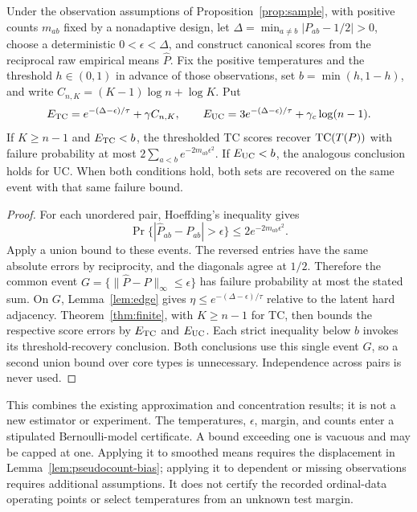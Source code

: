 \begin{corollary}\label{cor:finite-sample-recovery}
Under the observation assumptions of Proposition~\ref{prop:sample}, with positive counts $m_{ab}$ fixed by a nonadaptive design, let $\Delta=\min_{a\ne b}|P_{ab}-1/2|>0$, choose a deterministic $0<\epsilon<\Delta$, and construct canonical scores from the reciprocal raw empirical means $\widehat P$. Fix the positive temperatures and the threshold $h\in(0,1)$ in advance of those observations, set $b=\min(h,1-h)$, and write $C_{n,K}=(K-1)\log n+\log K$. Put
\[
E_{\mathrm{TC}}=e^{-(\Delta-\epsilon)/\tau}+\gamma C_{n,K},\qquad
E_{\mathrm{UC}}=3e^{-(\Delta-\epsilon)/\tau}+\gamma_c\log(n-1).
\]
If $K\ge n-1$ and $E_{\mathrm{TC}}<b$, the thresholded TC scores recover $\mathrm{TC}(T(P))$ with failure probability at most $2\sum_{a<b}e^{-2m_{ab}\epsilon^2}$. If $E_{\mathrm{UC}}<b$, the analogous conclusion holds for UC. When both conditions hold, both sets are recovered on the same event with that same failure bound.
\end{corollary}
\begin{proof}
For each unordered pair, Hoeffding's inequality gives
\[
\Pr\{|\widehat P_{ab}-P_{ab}|>\epsilon\}\le2e^{-2m_{ab}\epsilon^2}.
\]
Apply a union bound to these events. The reversed entries have the same absolute errors by reciprocity, and the diagonals agree at $1/2$. Therefore the common event
$G=\{\|\widehat P-P\|_\infty\le\epsilon\}$ has failure probability at most the stated sum. On $G$, Lemma~\ref{lem:edge} gives $\eta\le e^{-(\Delta-\epsilon)/\tau}$ relative to the latent hard adjacency. Theorem~\ref{thm:finite}, with $K\ge n-1$ for TC, then bounds the respective score errors by $E_{\mathrm{TC}}$ and $E_{\mathrm{UC}}$. Each strict inequality below $b$ invokes its threshold-recovery conclusion. Both conclusions use this single event $G$, so a second union bound over core types is unnecessary. Independence across pairs is never used.
\end{proof}
This combines the existing approximation and concentration results; it is not a new estimator or experiment. The temperatures, $\epsilon$, margin, and counts enter a stipulated Bernoulli-model certificate. A bound exceeding one is vacuous and may be capped at one. Applying it to smoothed means requires the displacement in Lemma~\ref{lem:pseudocount-bias}; applying it to dependent or missing observations requires additional assumptions. It does not certify the recorded ordinal-data operating points or select temperatures from an unknown test margin.

